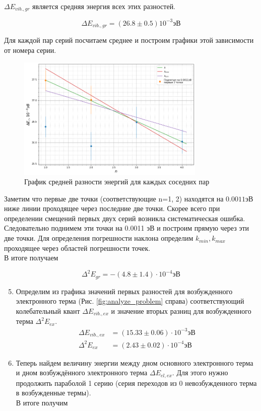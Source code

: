 \documentclass[11.5pt,a4paper,russian]{article}
\begin{document}
$\Delta E_{v i b ., g r}$ является средняя энергия всех этих разностей.

$$
\Delta E_{v i b ., g r} = (26.8 \pm 0.5) 10^{-3} \text{эВ}
$$

Для каждой пар серий посчитаем среднее и построим графики этой зависимости от номера серии.

\begin{figure}[h!]
  \centering
  \includegraphics[width=0.8\textwidth]{17dfeaf6-744c-448d-8d25-7ecdcdc88a9c}
  \caption{График средней разности энергий для каждых соседних пар}
\end{figure}

Заметим что первые две точки (соответствующие n=1, 2) находятся на $0.0011$эВ ниже линии проходящее через последние две точки. Скорее всего при определении смещений первых двух серий возникла систематическая ошибка. Следовательно поднимем эти точки на 0.0011 эВ и построим прямую через эти две точки. Для определения погрешности наклона определим $k_{min}, k_{max}$ проходящее через областей погрешности точек.\\
В итоге получаем

$$
\Delta^2 E_{gr} = - (4.8 \pm 1.4) \cdot 10^{-4} \text{эВ}
$$

\begin{enumerate}
  \setcounter{enumi}{4}
  \item Определим из графика значений первых разностей для возбужденного электронного терма (Рис. \ref{fig:analyze_problem} справа) соответствующий колебательный квант $\Delta E_{v i b ., e x}$ и значение вторых разниц для возбужденного терма $\Delta^2 E_{ex}$.\\
\begin{align}
\Delta E_{v i b ., e x} &= (15.33 \pm 0.06) \cdot 10^{-3} \text{эВ} \\
\Delta^2 E_{ex} &= (2.43 \pm 0.02) \cdot 10^{-4} \text{эВ}
\end{align}

  \item Теперь найдем величину энергии между дном основного электронного терма и дном возбуждённого электронного терма $\Delta E_{el, ex}$. Для этого нужно продолжить параболой 1 серию (серия переходов из 0 невозбужденного терма в возбужденные термы).\\
В итоге получим

\end{enumerate}
\end{document}
